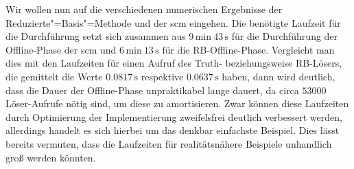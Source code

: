 \documentclass[../main.tex]{subfiles}
\begin{document}
Wir wollen nun auf die verschiedenen numerischen Ergebnisse der Reduzierte"=Basis"=Methode und der \acl{scm} eingehen.
Die benötigte Laufzeit für die Durchführung setzt sich zusammen aus $9\,\mathrm{min}~43\,\mathrm{s}$ für die Durchführung der Offline-Phase der \ac{scm} und $6\,\mathrm{min}~13\,\mathrm{s}$ für die RB-Offline-Phase.
Vergleicht man dies mit den Laufzeiten für einen Aufruf des Truth- beziehungsweise RB-Lösers, die gemittelt die Werte $0.0817\,\mathrm{s}$ respektive $0.0637\,\mathrm{s}$ haben, dann wird deutlich, dass die Dauer der Offline-Phase unpraktikabel lange dauert, da circa $53000$ Löser-Aufrufe nötig sind, um diese zu amortisieren.
Zwar können diese Laufzeiten durch Optimierung der Implementierung zweifelsfrei deutlich verbessert werden, allerdings handelt es sich hierbei um das denkbar einfachste Beispiel.
Dies lässt bereits vermuten, dass die Laufzeiten für realitätsnähere Beispiele unhandlich groß werden könnten.
\end{document}
